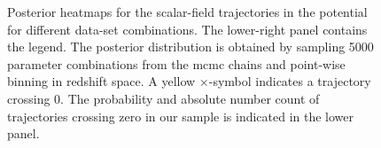 \begin{figure}[htbp]
    \tagstructend
    \caption[Posterior heatmaps for scalar field evolution.]{Posterior heatmaps for the scalar-field trajectories in the  potential for different data-set combinations. The lower-right panel contains the legend. The posterior distribution is obtained by sampling 5000 parameter combinations from the \gls{mcmc} chains and point-wise binning in redshift space. A yellow $\times$-symbol indicates a trajectory crossing 0. The probability and absolute number count of trajectories crossing zero in our sample is indicated in the lower panel.}
    \label{fig:HyperbolicPhiHeatmap}
\end{figure}